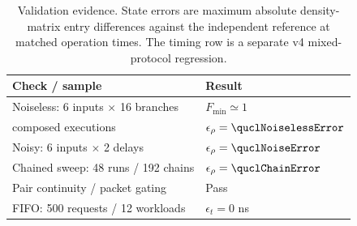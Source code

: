 \begin{table}[t]
\centering
\caption{Validation evidence. State errors are maximum absolute density-matrix entry differences against the independent reference at matched operation times. The timing row is a separate v4 mixed-protocol regression.}
\label{tab:qucl-validation}
\small
\begin{tabular}{@{}ll@{}}
\toprule
Check / sample & Result \\
\midrule
Noiseless: 6 inputs $\times$ 16 branches & $F_{\min}\simeq 1$ \\
\quad 96 composed executions & $\epsilon_\rho=\quclNoiselessError$ \\
Noisy: 6 inputs $\times$ 2 delays & $\epsilon_\rho=\quclNoiseError$ \\
Chained sweep: 48 runs / 192 chains & $\epsilon_\rho=\quclChainError$ \\
Pair continuity / packet gating & Pass \\
FIFO: 500 requests / 12 workloads & $\epsilon_t=0$ ns \\
\bottomrule
\end{tabular}
\end{table}
